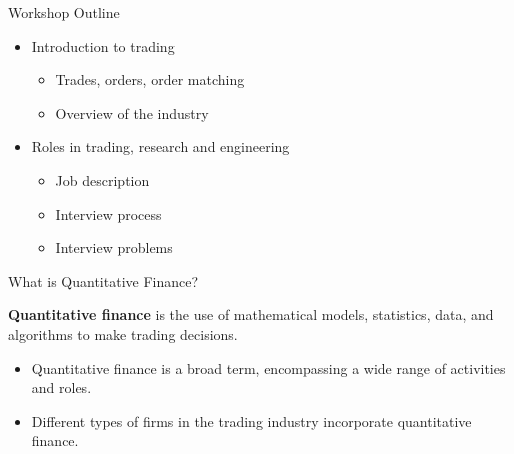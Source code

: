 
\usepackage{pdfpages}



{

}

\begin{frame}{Workshop Outline}
  \begin{itemize}
    \item Introduction to trading
    \begin{itemize}
      \item Trades, orders, order matching
      \item Overview of the industry
    \end{itemize}
    \item Roles in trading, research and engineering
    \begin{itemize}
      \item Job description
      \item Interview process
      \item Interview problems
    \end{itemize}
  \end{itemize}
\end{frame}

\begin{frame}{What is Quantitative Finance?}
  \begin{sqt:definition}
    \textbf{Quantitative finance} is the use of mathematical models, statistics, data,
    and algorithms to make trading decisions.
  \end{sqt:definition}

  \begin{itemize}
    \item Quantitative finance is a broad term, encompassing a wide range of activities and roles.
    \item Different types of firms in the trading industry incorporate quantitative finance.
  \end{itemize}
\end{frame}


